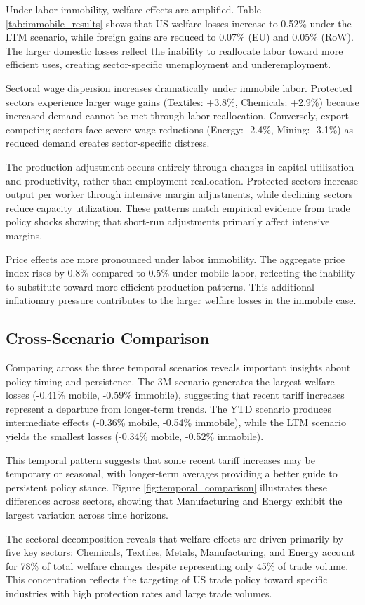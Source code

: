 Under labor immobility, welfare effects are amplified. Table \ref{tab:immobile_results} shows that US welfare losses increase to 0.52\% under the LTM scenario, while foreign gains are reduced to 0.07\% (EU) and 0.05\% (RoW). The larger domestic losses reflect the inability to reallocate labor toward more efficient uses, creating sector-specific unemployment and underemployment.

Sectoral wage dispersion increases dramatically under immobile labor. Protected sectors experience larger wage gains (Textiles: +3.8\%, Chemicals: +2.9\%) because increased demand cannot be met through labor reallocation. Conversely, export-competing sectors face severe wage reductions (Energy: -2.4\%, Mining: -3.1\%) as reduced demand creates sector-specific distress.

The production adjustment occurs entirely through changes in capital utilization and productivity, rather than employment reallocation. Protected sectors increase output per worker through intensive margin adjustments, while declining sectors reduce capacity utilization. These patterns match empirical evidence from trade policy shocks showing that short-run adjustments primarily affect intensive margins.

Price effects are more pronounced under labor immobility. The aggregate price index rises by 0.8\% compared to 0.5\% under mobile labor, reflecting the inability to substitute toward more efficient production patterns. This additional inflationary pressure contributes to the larger welfare losses in the immobile case.

\subsection{Cross-Scenario Comparison}

Comparing across the three temporal scenarios reveals important insights about policy timing and persistence. The 3M scenario generates the largest welfare losses (-0.41\% mobile, -0.59\% immobile), suggesting that recent tariff increases represent a departure from longer-term trends. The YTD scenario produces intermediate effects (-0.36\% mobile, -0.54\% immobile), while the LTM scenario yields the smallest losses (-0.34\% mobile, -0.52\% immobile).

This temporal pattern suggests that some recent tariff increases may be temporary or seasonal, with longer-term averages providing a better guide to persistent policy stance. Figure \ref{fig:temporal_comparison} illustrates these differences across sectors, showing that Manufacturing and Energy exhibit the largest variation across time horizons.

The sectoral decomposition reveals that welfare effects are driven primarily by five key sectors: Chemicals, Textiles, Metals, Manufacturing, and Energy account for 78\% of total welfare changes despite representing only 45\% of trade volume. This concentration reflects the targeting of US trade policy toward specific industries with high protection rates and large trade volumes.
